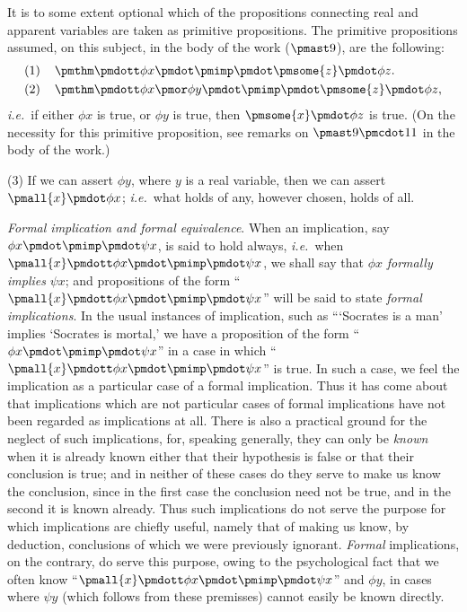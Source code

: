 \documentclass[letterpaper,12pt,openany,leqno]{book}
\begin{document}
It is to some extent optional which of the propositions connecting real and apparent variables are taken as primitive propositions. The primitive propositions assumed, on this subject, in the body of the work ($\pmast9$), are the following:
\begin{align*}
	(1) \hspace{.4cm} & \pmthm \pmdott \phi x \pmdot \pmimp \pmdot \pmsome{z} \pmdot \phi z.\\
	(2) \hspace{.4cm} & \pmthm \pmdott \phi x \pmor \phi y \pmdot \pmimp \pmdot \pmsome{z} \pmdot \phi z,
\end{align*}
\textit{i.e.}\ if either $\phi x$ is true, or $\phi y$ is true, then $\pmsome{x}\pmdot\phi z$ is true. (On the necessity for this primitive proposition, see remarks on $\pmast9\pmcdot11$ in the body of the work.)

(3) If we can assert $\phi y$, where $y$ is a real variable, then we can assert $\pmall{x}\pmdot \phi x$; \textit{i.e.}\ what holds of any, however chosen, holds of all.

\textit{Formal implication and formal equivalence}. When an implication, say $\phi x \pmdot \pmimp \pmdot \psi x$, is said to hold always, \textit{i.e.}\ when $\pmall{x} \pmdott \phi x \pmdot \pmimp \pmdot \psi x$, we shall say that $\phi x$ \textit{formally implies} $\psi x$; and propositions of the form ``$\pmall{x} \pmdott \phi x \pmdot \pmimp \pmdot \psi x$'' will be said to state \textit{formal implications}. In the usual instances of implication, such as ```Socrates is a man' implies `Socrates is mortal,' we have a proposition of the form ``$\phi x \pmdot \pmimp \pmdot \psi x$'' in a case in which ``$\pmall{x}\pmdott\phi x\pmdot\pmimp\pmdot\psi x$'' is true. In such a case, we feel the implication as a particular case of a formal implication. Thus it has come about that implications which are not particular cases of formal implications have not been regarded as implications at all. There is also a practical ground for the neglect of such implications, for, speaking generally, they can only be \textit{known} when it is already known either that their hypothesis is false or that their conclusion is true; and in neither of these cases do they serve to make us know the conclusion, since in the first case the conclusion need not be true, and in the second it is known already. Thus such implications do not serve the purpose for which implications are chiefly useful, namely that of making us know, by deduction, conclusions of which we were previously ignorant. \textit{Formal} implications, on the contrary, do serve this purpose, owing to the psychological fact that we often know ``$\pmall{x} \pmdott \phi x\pmdot \pmimp \pmdot \psi x$'' and $\phi y$, in cases where $\psi y$ (which follows from these premisses) cannot easily be known directly.
\end{document}
